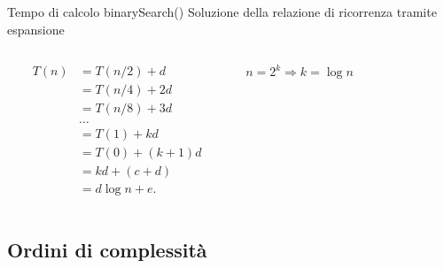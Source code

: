 \begin{frame}{Tempo di calcolo \textsf{binarySearch}()}
Soluzione della relazione di ricorrenza tramite espansione
\begin{columns}[c]
\begin{column}{0.5\textwidth}
\begin{align*}
T(n) 	&= T(n/2) + d\\
		&= T(n/4) + 2d\\
		&= T(n/8) + 3d\\
		& \ldots\\
		&= T(1) + kd\\
		&= T(0) + (k+1)d\\
		&= kd+(c+d) \\
		&= d \log n + e.
\end{align*}
\end{column}
\begin{column}{0.3\textwidth}
\begin{beamerboxesrounded}[shadow=true]{}
\begin{center}
$n = 2^k \Rightarrow k = \log n$
\end{center}
\end{beamerboxesrounded}
\end{column}
\begin{column}{0.2\textwidth}
\end{column}
\end{columns}

\end{frame}

\subsection{Ordini di complessità}

